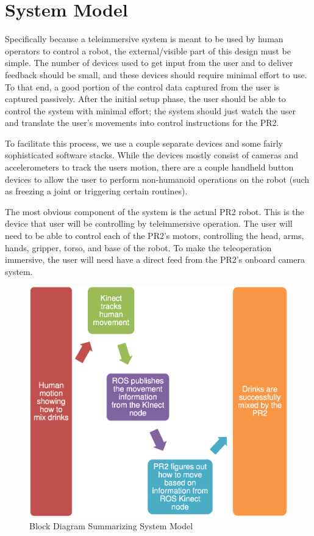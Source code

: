 \documentclass{sig-alternate}
\begin{document}
\section{System Model}
Specifically because a teleimmersive system is meant to be used by human 
operators to control a robot, the external/visible part of this
design must be simple. The number of devices used to get input from the user 
and to deliver feedback should be small, and these devices should require
minimal effort to use. To that
end, a good portion of the control data captured from the user is captured
passively. After the initial setup phase, the user should be able to control
the system with minimal effort; the system should just watch the user and
translate the user's movements into control instructions for the PR2.

To facilitate this process, we use a couple separate devices and some
fairly sophisticated software stacks. While the
devices mostly consist of cameras and accelerometers to track the users 
motion, there are a couple handheld button devices to allow the user to
perform non-humanoid operations on the robot (such as freezing a joint or
triggering certain routines).

The most obvious component of the system is the actual PR2 robot. This is the
device that user will be controlling by teleimmersive operation. The user will
need to be able to control each of the PR2's motors, controlling the head,
arms, hands, gripper, torso, and base of the robot. To make the teleoperation
immersive, the user will need have a direct feed from the PR2's onboard
camera system.

\begin{figure}[htb] 
	\begin{center}
		\includegraphics[width=1.0\linewidth]{flowchart}
	\end{center}
	\caption{Block Diagram Summarizing System Model}
	\label{fig:some_graph}
\end{figure}
\end{document}

